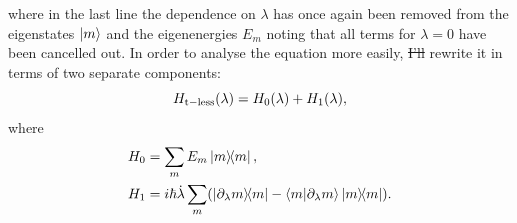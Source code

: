 \documentclass[a4paper,oneside,11pt]{book}
\newcommand{\dlambda}{\partial_{\lambda}}
\newcommand{\dotlambda}{\dot{\lambda}}
\providecommand{\DIFaddtex}[1]{{\protect\color{blue}\uwave{#1}}} %
\providecommand{\DIFdeltex}[1]{{\protect\color{red}\sout{#1}}}                      %
\providecommand{\DIFaddbegin}{} %
\providecommand{\DIFaddend}{} %
\providecommand{\DIFdelbegin}{} %
\providecommand{\DIFdelend}{} %
\providecommand{\DIFadd}[1]{\texorpdfstring{\DIFaddtex{#1}}{#1}} %
\providecommand{\DIFdel}[1]{\texorpdfstring{\DIFdeltex{#1}}{}} %
\newcommand{\DIFscaledelfig}{0.5}
\newlength{\DIFdelgraphicswidth} %
\newlength{\DIFdelgraphicsheight} %
\newcommand{\DIFaddincludegraphics}[2][]{{\color{blue}\fbox{\DIFOincludegraphics[#1]{#2}}}} %
\newcommand{\DIFdelincludegraphics}[2][]{%
\sbox{\DIFdelgraphicsbox}{\DIFOincludegraphics[#1]{#2}}%
\settoboxwidth{\DIFdelgraphicswidth}{\DIFdelgraphicsbox} %
\settoboxtotalheight{\DIFdelgraphicsheight}{\DIFdelgraphicsbox} %
\scalebox{\DIFscaledelfig}{%
\parbox[b]{\DIFdelgraphicswidth}{\usebox{\DIFdelgraphicsbox}\\[-\baselineskip] \rule{\DIFdelgraphicswidth}{0em}}\llap{\resizebox{\DIFdelgraphicswidth}{\DIFdelgraphicsheight}{%
\setlength{\unitlength}{\DIFdelgraphicswidth}%
\begin{picture}(1,1)%
\thicklines\linethickness{2pt} %
{\color[rgb]{1,0,0}\put(0,0){\framebox(1,1){}}}%
{\color[rgb]{1,0,0}\put(0,0){\line( 1,1){1}}}%
{\color[rgb]{1,0,0}\put(0,1){\line(1,-1){1}}}%
\end{picture}%
}\hspace*{3pt}}} %
} %
\DeclareRobustCommand{\DIFaddbegin}{\DIFOaddbegin \let\includegraphics\DIFaddincludegraphics} %
\DeclareRobustCommand{\DIFaddend}{\DIFOaddend \let\includegraphics\DIFOincludegraphics} %
\DeclareRobustCommand{\DIFdelbegin}{\DIFOdelbegin \let\includegraphics\DIFdelincludegraphics} %
\DeclareRobustCommand{\DIFdelend}{\DIFOaddend \let\includegraphics\DIFOincludegraphics} %
\begin{document}
    where in the last line the dependence on $\lambda$ has once again been removed from the eigenstates $\ket{m}$ and the eigenenergies $E_m$ noting that all terms for $\lambda = 0$ have been cancelled out. In order to analyse the equation more easily, \DIFdelbegin \DIFdel{I'll }\DIFdelend \DIFaddbegin \DIFadd{we }\DIFaddend rewrite it in terms of two separate components:
    \begin{equation}\label{eq:transitionless_h0_h1}
        H_{\rm t-less}(\lambda) = H_0(\lambda) + H_1(\lambda),
    \end{equation}
    where 
    \begin{equation}
        \begin{aligned}
            H_0 &= \sum_m E_m \dyad{m}, \\
            H_1 &= i\hbar \dotlambda \sum_m (\dyad{\dlambda m}{m} - \braket{m}{\dlambda m} \dyad{m}).
        \end{aligned}
    \end{equation}
\end{document}

